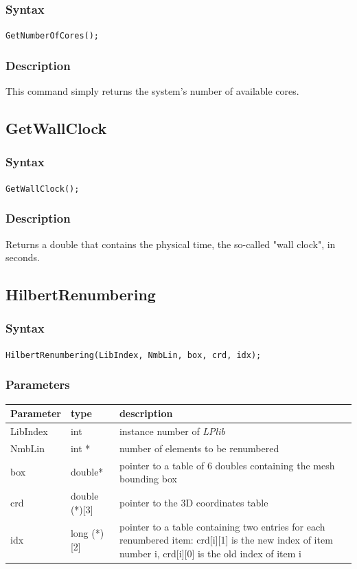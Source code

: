 \documentclass[a4paper,12pt]{article}
\begin{document}
\subsubsection*{Syntax}
\tt{GetNumberOfCores();}
\normalfont

\subsubsection*{Description}
This command simply returns the system's number of available cores.

\subsection{GetWallClock}

\subsubsection*{Syntax}
\tt{GetWallClock();}
\normalfont

\subsubsection*{Description}
Returns a double that contains the physical time, the so-called "wall clock", in seconds.

\subsection{HilbertRenumbering}

\subsubsection*{Syntax}
\tt{HilbertRenumbering(LibIndex, NmbLin, box, crd, idx);}
\normalfont

\subsubsection*{Parameters}
\begin{tabular}{|m{2cm}|m{3cm}|m{8cm}|}
\hline
Parameter  & type   & description \\
\hline
LibIndex   & int    & instance number of \emph{LPlib} \\
\hline
NmbLin     & int * & number of elements to be renumbered \\
\hline
box        & double* & pointer to a table of 6 doubles containing the mesh bounding box \\
\hline
crd        & double (*)[3] & pointer to the 3D coordinates table \\
\hline
idx        & long (*)[2] & pointer to a table containing two entries for each renumbered item: crd[i][1] is the new index of item number i, crd[i][0] is the old index of item i \\
\hline
\end{tabular}
\end{document}
